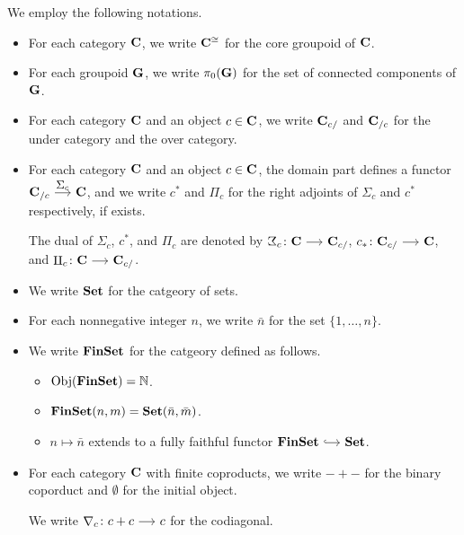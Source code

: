 \documentclass[a4paper,dvipsnames, 11pt]{amsart} %
\begin{document}
\maketitle
\cite{FS19}
\begin{notation}
	We employ the following notations.
	\begin{itemize}
		\item %
			For each category $\mathbf{C}$,
			we write ${\mathbf{C}}^{\cong}$ for the core groupoid of $\mathbf{C}$.
		\item %
			For each groupoid $\mathbf{G}$, we write $\pi_0(\mathbf{G})$ for the set of connected components of $\mathbf{G}$.
		\item %
			For each category $\mathbf{C}$ and an object $c\in\mathbf{C}$,
			we write $\mathbf{C}_{c/}$ and $\mathbf{C}_{/c}$ for the under category and the over category.
		\item %
			For each category $\mathbf{C}$ and an object $c\in\mathbf{C}$,
			the domain part defines a functor $\one{C}_{/c}\arr"\Sigma_c"\one{C}$,
			and we write $c^*$ and $\Pi_c$ for the right adjoints of $\Sigma_c$ and $c^*$ respectively,
			if exists.

			The dual of $\Sigma_c$, $c^*$, and $\Pi_c$ are
			denoted by $\arbSigma_c\colon\one{C}\arr\one{C}_{c/}$, $c_*\colon\one{C}_{c/}\arr\one{C}$, and $\arbPi_c\colon\one{C}\arr\one{C}_{c/}$.
		\item %
			We write $\mathbf{Set}$ for the catgeory of sets.
		\item %
			For each nonnegative integer $n$,
			we write $\bar{n}$ for the set $\{1,\ldots,n\}$.
		\item %
			We write $\mathbf{FinSet}$ for the catgeory defined as follows.
			\begin{itemize}
				\item %
					$\operatorname{\mathrm{Obj}}(\mathbf{FinSet})=\mathbb{N}$.
				\item %
					$\mathbf{FinSet}(n,m)=\mathbf{Set}(\bar{n},\bar{m})$.
				\item %
					$n\mapsto\bar{n}$ extends to a fully faithful functor $\FinSet\arr[hook]\Set$.
			\end{itemize}
		\item %
			For each category $\mathbf{C}$ with finite coproducts,
			we write $-+-$ for the binary coporduct and $\emptyset$ for the initial object.

			We write ${\Atled}_c\colon c+c\arr c$ for the codiagonal.
	\end{itemize}
\end{notation}
\end{document}
